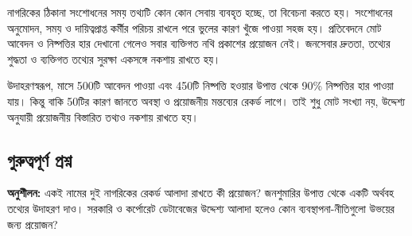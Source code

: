 নাগরিকের ঠিকানা সংশোধনের সময় তথ্যটি কোন কোন সেবায় ব্যবহৃত হচ্ছে, তা বিবেচনা করতে হয়। সংশোধনের অনুমোদন, সময় ও দায়িত্বপ্রাপ্ত কর্মীর পরিচয় রাখলে পরে ভুলের কারণ খুঁজে পাওয়া সহজ হয়। প্রতিবেদনে মোট আবেদন ও নিষ্পত্তির হার দেখানো গেলেও সবার ব্যক্তিগত নথি প্রকাশের প্রয়োজন নেই। জনসেবার দ্রুততা, তথ্যের শুদ্ধতা ও ব্যক্তিগত তথ্যের সুরক্ষা একসঙ্গে নকশায় রাখতে হয়।

উদাহরণস্বরূপ, মাসে 500টি আবেদন পাওয়া এবং 450টি নিষ্পত্তি হওয়ার উপাত্ত থেকে 90\% নিষ্পত্তির হার পাওয়া যায়। কিন্তু বাকি 50টির কারণ জানতে অবস্থা ও প্রয়োজনীয় মন্তব্যের রেকর্ড লাগে। তাই শুধু মোট সংখ্যা নয়, উদ্দেশ্য অনুযায়ী প্রয়োজনীয় বিস্তারিত তথ্যও নকশায় রাখতে হয়।

\subsection{গুরুত্বপূর্ণ প্রশ্ন}
\textbf{অনুশীলন:} একই নামের দুই নাগরিকের রেকর্ড আলাদা রাখতে কী প্রয়োজন? জনশুমারির উপাত্ত থেকে একটি অর্থবহ তথ্যের উদাহরণ দাও। সরকারি ও কর্পোরেট ডেটাবেজের উদ্দেশ্য আলাদা হলেও কোন ব্যবস্থাপনা-নীতিগুলো উভয়ের জন্য প্রয়োজন?


